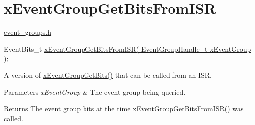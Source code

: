 \hypertarget{group__xEventGroupGetBitsFromISR}{\section{x\-Event\-Group\-Get\-Bits\-From\-I\-S\-R}
\label{group__xEventGroupGetBitsFromISR}
}
\hyperlink{event__groups_8h}{event\-\_\-groups.\-h} 
\begin{DoxyPre}
   EventBits\_t \hyperlink{event__groups_8h_a95822db4357d0b77c35aed0c7427eca0}{xEventGroupGetBitsFromISR( EventGroupHandle\_t xEventGroup )};
\end{DoxyPre}


A version of \hyperlink{event__groups_8h_a0ae86f092fb07ccb475ae938f9a12584}{x\-Event\-Group\-Get\-Bits()} that can be called from an I\-S\-R.


\begin{DoxyParams}{Parameters}
{\em x\-Event\-Group} & The event group being queried.\\
\hline
\end{DoxyParams}
\begin{DoxyReturn}{Returns}
The event group bits at the time \hyperlink{event__groups_8h_a95822db4357d0b77c35aed0c7427eca0}{x\-Event\-Group\-Get\-Bits\-From\-I\-S\-R()} was called. 
\end{DoxyReturn}
